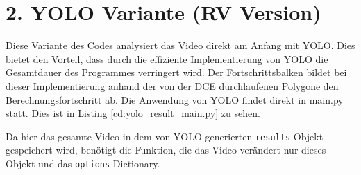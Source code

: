 \section{2. YOLO Variante (RV Version)}{
	\label{py:YOLO_res_vers}
	Diese Variante des Codes analysiert das Video direkt am Anfang mit YOLO. Dies bietet den Vorteil, dass durch die effiziente Implementierung von YOLO die Gesamtdauer des Programmes verringert wird. Der Fortschrittsbalken bildet bei dieser Implementierung anhand der von der DCE durchlaufenen Polygone den Berechnungsfortschritt ab.  Die Anwendung von YOLO findet direkt in main.py statt. Dies ist in Listing \ref{cd:yolo_result_main.py} zu sehen.

	

	Da hier das gesamte Video in dem von YOLO generierten \lstinline|results| Objekt gespeichert wird, benötigt die Funktion, die das Video verändert nur dieses Objekt und das \lstinline|options| Dictionary. \\
	

}
